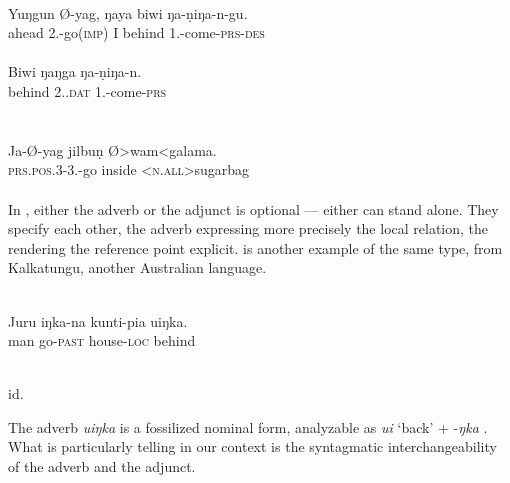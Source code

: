 \newpage
\ea\label{ex:E64}
 \\
 \ea
 \gll Yuŋgun  Ø-yag,  ŋaya  biwi  ŋa-\d{n}iŋa-n-gu.\\
  ahead  2.\glsg-go(\textsc{imp})  I  behind  1.\glsg-come-\textsc{prs}-\textsc{des}\\
\\
\ex
\gll  Biwi  ŋaŋga  ŋa-\d{n}iŋa-n.\\
   behind  2.\glsg.\textsc{dat}  1.\glsg-come-\textsc{prs}\\
\\
\z
\z
\noindent \ea\label{ex:E65}
\\
\gll Ja-Ø-yag  jilbu\d{n}  Ø{\textgreater}wam{\textless}galama.\\
 \textsc{prs}.\textsc{pos}.3-3.\glsg-go  inside  {\textless}\textsc{n}.\textsc{all}{\textgreater}sugarbag\\
\\
\z
\noindent In , either the adverb or the \np adjunct is optional — either can stand alone. They specify each other, the adverb expressing more precisely the local relation, the \np rendering the reference point explicit.  is another example of the same type, from Kalkatungu, another Australian language.

\ea\label{ex:E66}
 \\
\gll Juru  iŋka-na  kunti-pia  uiŋka.\\
man  go-\textsc{past}  house-\textsc{loc}  behind\\
\\
\z
\noindent %

\begin{exe} %
	\glt id.
\end{exe}


\noindent\label{page96}The adverb \textit{uiŋka} is a fossilized nominal form, analyzable as \textit{ui} ‘back’ + -\textit{ŋka} \glloc. What is particularly telling in our context is the syntagmatic interchangeability of the adverb and the \np adjunct.


